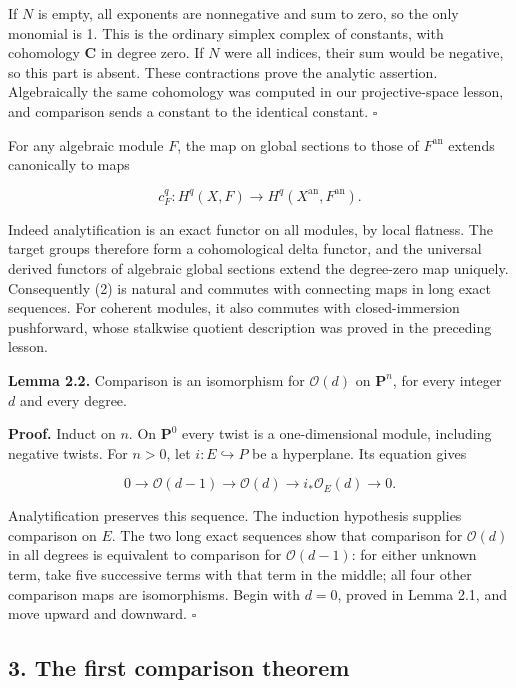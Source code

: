 \documentclass[11pt]{article}
\begin{document}
If \(N\) is empty, all exponents are nonnegative and sum to zero, so the
only monomial is 1. This is the ordinary simplex complex of constants,
with cohomology \(\mathbf C\) in degree zero. If \(N\) were all indices,
their sum would be negative, so this part is absent. These contractions
prove the analytic assertion. Algebraically the same cohomology was
computed in our projective-space lesson, and comparison sends a constant
to the identical constant. \(\square\)

For any algebraic module \(F\), the map on global sections to those of
\(F^{\mathrm{an}}\) extends canonically to maps

\[
c_F^q:H^q(X,F)\longrightarrow H^q(X^{\mathrm{an}},F^{\mathrm{an}}).
\tag{2}
\]

Indeed analytification is an exact functor on all modules, by local
flatness. The target groups therefore form a cohomological delta
functor, and the universal derived functors of algebraic global sections
extend the degree-zero map uniquely. Consequently (2) is natural and
commutes with connecting maps in long exact sequences. For coherent
modules, it also commutes with closed-immersion pushforward, whose
stalkwise quotient description was proved in the preceding lesson.

\textbf{Lemma 2.2.} Comparison is an isomorphism for \(\mathcal O(d)\)
on \(\mathbf P^n\), for every integer \(d\) and every degree.

\textbf{Proof.} Induct on \(n\). On \(\mathbf P^0\) every twist is a
one-dimensional module, including negative twists. For \(n>0\), let
\(i:E\hookrightarrow P\) be a hyperplane. Its equation gives

\[
0\to\mathcal O(d-1)\to\mathcal O(d)
\to i_*\mathcal O_E(d)\to0.
\tag{3}
\]

Analytification preserves this sequence. The induction hypothesis
supplies comparison on \(E\). The two long exact sequences show that
comparison for \(\mathcal O(d)\) in all degrees is equivalent to
comparison for \(\mathcal O(d-1)\): for either unknown term, take five
successive terms with that term in the middle; all four other comparison
maps are isomorphisms. Begin with \(d=0\), proved in Lemma 2.1, and move
upward and downward. \(\square\)

\subsection{3. The first comparison
theorem}\label{the-first-comparison-theorem}
\end{document}
